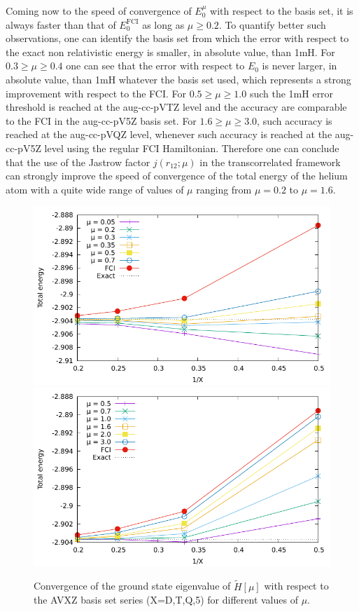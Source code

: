 \documentclass[aip,jcp,reprint,noshowkeys,superscriptaddress]{revtex4-1}
\begin{document}
Coming now to the speed of convergence of $E_0^\mu$ with respect to the basis set, it is always faster than that of $E_0^\text{FCI}$ as long as $\mu \ge 0.2$. 
To quantify better such observations, one can identify the basis set from which the error with respect to the exact non relativistic energy is smaller, in absolute value, than 1mH. 
For $0.3\ge\mu\ge0.4$ one can see that the error with respect to $E_0$ is never larger, in absolute value, than 1mH whatever the basis set used, which represents a strong improvement with respect to the FCI. For $0.5\ge \mu \ge 1.0$ such the 1mH error threshold is reached at the aug-cc-pVTZ level and the accuracy are comparable to the FCI in the aug-cc-pV5Z basis set. For $1.6\ge \mu \ge 3.0$, such accuracy is reached at the aug-cc-pVQZ level, whenever such accuracy is reached at the aug-cc-pV5Z level using the regular FCI Hamiltonian. 
Therefore one can conclude that the use of the Jastrow factor $j(r_{12};\mu)$ in the transcorrelated framework can strongly improve the speed of convergence of the total energy of the helium atom with a quite wide range of values of $\mu$ ranging from $\mu=0.2$ to $\mu=1.6$. 
\begin{figure}
 \label{fig_conv_e_mu}
        \includegraphics[width=0.45\linewidth]{E_conv_basis_small_mu.pdf}
        \includegraphics[width=0.45\linewidth]{E_conv_basis_large_mu.pdf}\\
        \caption{Convergence of the ground state eigenvalue of $\tilde{H}[\mu]$ with respect to the AVXZ basis set series (X=D,T,Q,5) for different values of $\mu$.}
\end{figure}
\end{document}
